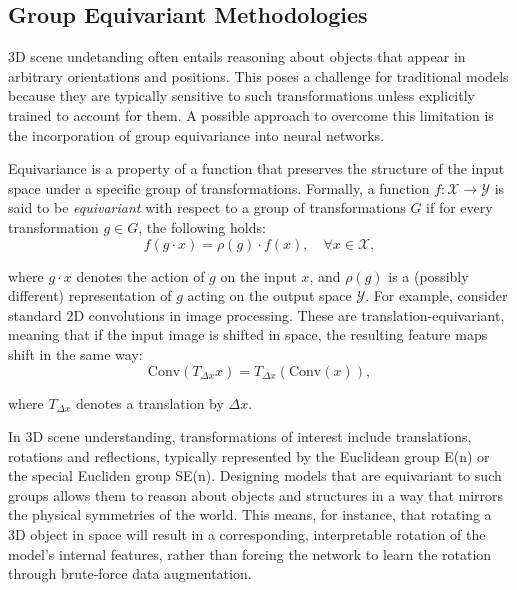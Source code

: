 \subsection{Group Equivariant Methodologies}

3D scene undetanding often entails reasoning about objects that appear in arbitrary
orientations and positions. This poses a challenge for traditional models
because they are typically sensitive to such transformations unless explicitly
trained to account for them.
%
A possible approach to overcome this limitation is the incorporation of group
equivariance into neural networks.

Equivariance is a property of a function that preserves the structure of the
input space under a specific group of transformations.
%
Formally, a function $f: \mathcal{X} \rightarrow \mathcal{Y}$ is said to be
\emph{equivariant} with respect to a group of transformations $G$ if for every
transformation $g \in G$, the following holds:
\begin{equation}\label{eq:equivariance}
    f(g \cdot x) = \rho(g) \cdot f(x), \quad \forall x \in \mathcal{X},
\end{equation}

where $g \cdot x$ denotes the action of $g$ on the input $x$, and $\rho(g)$ is
a (possibly different) representation of $g$ acting on the output space
$\mathcal{Y}$.
%
For example, consider standard 2D convolutions in image processing. These are
translation-equivariant, meaning that if the input image is shifted in space,
the resulting feature maps shift in the same way:
\begin{equation}\label{eq:translation-equivariance}
    \text{Conv}(T_{\Delta x} x) = T_{\Delta x}(\text{Conv}(x)),
\end{equation}

where $T_{\Delta x}$ denotes a translation by $\Delta x$.

In 3D scene understanding, transformations of interest include translations,
rotations and reflections, typically represented by the Euclidean group E(n) or
the special Eucliden group SE(n).
%
Designing models that are equivariant to such groups allows them to reason
about objects and structures in a way that mirrors the physical symmetries of
the world. This means, for instance, that rotating a 3D object in space will
result in a corresponding, interpretable rotation of the model’s internal
features, rather than forcing the network to learn the rotation through
brute-force data augmentation.
%

